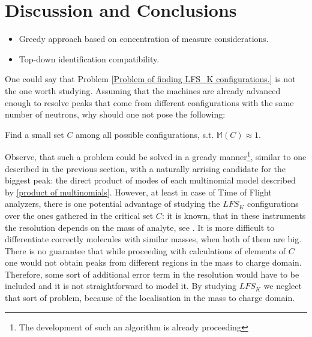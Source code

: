 \section{Discussion and Conclusions}


\begin{itemize}
	\item 	Greedy approach based on concentration of measure considerations. 
	\item  	Top-down identification compatibility. 
\end{itemize}


One could say that Problem \ref{Problem of finding LFS_K configurations.} is not the one worth studying. Assuming that the machines are already advanced enough to resolve peaks that come from different configurations with the same number of neutrons, why should one not pose the following:

\begin{Problem}
	Find a small set $C$ among all possible configurations, s.t. $\mathbb{M}(C) \approx 1$.
\end{Problem}

Observe, that such a problem could be solved in a gready manner\footnote{The development of such an algorithm is already proceeding }, similar to one described in the previous section, with a naturally arrising candidate for the biggest peak: the direct product of modes of each multinomial model described by \eqref{product of multinomials}. However, at least in case of Time of Flight analyzers, there is one potential advantage of studying the $LFS_K$ configurations over the ones gathered in the critical set $C$: it is known, that in these instruments the resolution depends on the mass of analyte, see \cite{Eidhammer2008ComputationalMethodsInMassSpectrometry}. It is more difficult to differentiate correctly molecules with similar masses, when both of them are big. There is no guarantee that while proceeding with calculations of elements of $C$ one would not obtain peaks from different regions in the mass to charge domain. Therefore, some sort of additional error term in the resolution would have to be included and it is not straightforward to model it. By studying $LFS_K$ we neglect that sort of problem, because of the localisation in the mass to charge domain.

